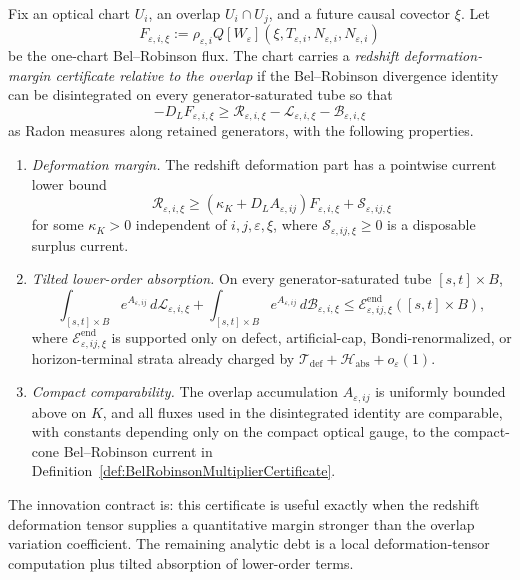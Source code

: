 \begin{definition}\label{def:RedshiftDeformationMarginCertificate}
Fix an optical chart $U_i$, an overlap $U_i\cap U_j$, and a future causal covector $\xi$.  Let
\[
    F_{\varepsilon,i,\xi}
    :=
    \rho_{\varepsilon,i}
    Q[W_\varepsilon](\xi,T_{\varepsilon,i},N_{\varepsilon,i},N_{\varepsilon,i})
\]
be the one-chart Bel--Robinson flux.  The chart carries a \emph{redshift deformation-margin certificate relative to the overlap} if the Bel--Robinson divergence identity can be disintegrated on every generator-saturated tube so that
\[
    -D_LF_{\varepsilon,i,\xi}
    \ge
    \mathcal R_{\varepsilon,i,\xi}
    -
    \mathcal L_{\varepsilon,i,\xi}
    -
    \mathcal B_{\varepsilon,i,\xi}
\]
as Radon measures along retained generators, with the following properties.
\begin{enumerate}
    \item \emph{Deformation margin.}  The redshift deformation part has a pointwise current lower bound
    \[
        \mathcal R_{\varepsilon,i,\xi}
        \ge
        \left(\kappa_K+D_LA_{\varepsilon,ij}\right)
        F_{\varepsilon,i,\xi}
        +
        \mathcal S_{\varepsilon,ij,\xi}
    \]
    for some $\kappa_K>0$ independent of $i,j,\varepsilon,\xi$, where $\mathcal S_{\varepsilon,ij,\xi}\ge0$ is a disposable surplus current.
    \item \emph{Tilted lower-order absorption.}  On every generator-saturated tube $[s,t]\times B$,
    \[
        \int_{[s,t]\times B}e^{A_{\varepsilon,ij}}\,
        d\mathcal L_{\varepsilon,i,\xi}
        +
        \int_{[s,t]\times B}e^{A_{\varepsilon,ij}}\,
        d\mathcal B_{\varepsilon,i,\xi}
        \le
        \mathcal E^{\mathrm{end}}_{\varepsilon,ij,\xi}([s,t]\times B),
    \]
    where $\mathcal E^{\mathrm{end}}_{\varepsilon,ij,\xi}$ is supported only on defect, artificial-cap, Bondi-renormalized, or horizon-terminal strata already charged by
    $\mathcal T_{\mathrm{def}}+\mathcal H_{\mathrm{abs}}+o_\varepsilon(1)$.
    \item \emph{Compact comparability.}  The overlap accumulation $A_{\varepsilon,ij}$ is uniformly bounded above on $K$, and all fluxes used in the disintegrated identity are comparable, with constants depending only on the compact optical gauge, to the compact-cone Bel--Robinson current in Definition~\ref{def:BelRobinsonMultiplierCertificate}.
\end{enumerate}
The innovation contract is: this certificate is useful exactly when the redshift deformation tensor supplies a quantitative margin stronger than the overlap variation coefficient.  The remaining analytic debt is a local deformation-tensor computation plus tilted absorption of lower-order terms.
\end{definition}

